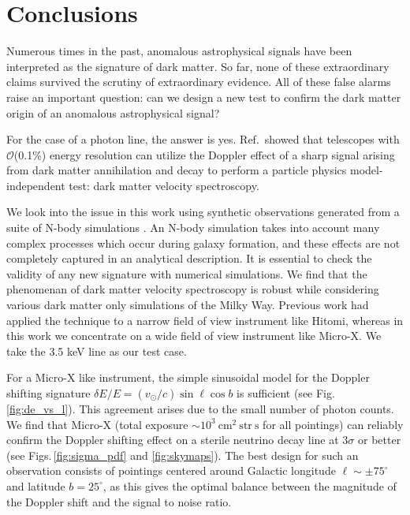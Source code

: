 \documentclass[aps,prd,10pt,twocolumn,superscriptaddress,showpacs,footinbib]{revtex4-1}
\newcommand{\units}[1]{~\mathrm{#1}}
\begin{document}
\section{Conclusions}
\label{sec:conclusions}

Numerous times in the past, anomalous astrophysical signals have been interpreted as the signature of dark matter.  So far, none of these extraordinary claims survived the scrutiny of extraordinary evidence.  All of these false alarms raise an important question:  can we design a new test to confirm the dark matter origin of an anomalous astrophysical signal?  

For the case of a photon line, the answer is yes.  Ref.\,\cite{speckhard2016} showed that telescopes with $\mathcal{O}$(0.1\%) energy resolution can utilize the Doppler effect of a sharp signal arising from dark matter annihilation and decay to perform a particle physics model-independent test: dark matter velocity spectroscopy.

We look into the issue in this work using synthetic observations generated from a suite
of N-body simulations \cite{mao2015}.  An N-body simulation takes into account many complex processes which occur during galaxy formation, and these effects are not completely captured in an analytical description.  It is essential to check the validity of any new signature with  numerical simulations.  We find that the phenomenan of dark matter velocity spectroscopy is robust while considering various dark matter only simulations of the Milky Way.  Previous work had applied the technique to a narrow field of view instrument like Hitomi, whereas in this work we concentrate on a wide field of view instrument like Micro-X.  We take the 3.5 keV line as our test case. 

 For a Micro-X like instrument, the simple sinusoidal model for the Doppler shifting signature $\delta E/E
= (v_\odot/c) \sin \ell \cos b$ is sufficient (see Fig.\,\ref{fig:de_vs_l}).  This agreement arises due to the small number of photon counts.  We find that Micro-X (total
exposure $\sim10^3\units{cm^2~str~s}$ for all pointings) can reliably confirm the Doppler
shifting effect on a sterile neutrino decay line at $3\sigma$ or better (see Figs.\,\ref{fig:sigma_pdf} and \ref{fig:skymaps}). The best design for such an
observation consists of pointings centered around Galactic longitude $\ell\sim\pm75^\circ$ and
latitude $b=25^\circ$, as this gives the optimal balance between the magnitude of the Doppler shift
and the signal to noise ratio. 
\end{document}
